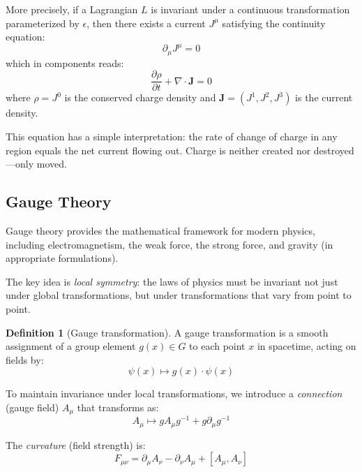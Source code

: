 \documentclass[12pt,letterpaper]{article}
\theoremstyle{definition}
\newtheorem{definition}[theorem]{Definition}
\theoremstyle{remark}
\begin{document}
More precisely, if a Lagrangian $L$ is invariant under a continuous transformation parameterized by $\epsilon$, then there exists a current $J^\mu$ satisfying the continuity equation:
\begin{equation}
\partial_\mu J^\mu = 0
\end{equation}
which in components reads:
\begin{equation}
\frac{\partial \rho}{\partial t} + \nabla \cdot \mathbf{J} = 0
\end{equation}
where $\rho = J^0$ is the conserved charge density and $\mathbf{J} = (J^1, J^2, J^3)$ is the current density.

This equation has a simple interpretation: the rate of change of charge in any region equals the net current flowing out. Charge is neither created nor destroyed---only moved.

\subsection{Gauge Theory}

Gauge theory provides the mathematical framework for modern physics, including electromagnetism, the weak force, the strong force, and gravity (in appropriate formulations).

The key idea is \textit{local symmetry}: the laws of physics must be invariant not just under global transformations, but under transformations that vary from point to point.

\begin{definition}[Gauge transformation]
A gauge transformation is a smooth assignment of a group element $g(x) \in G$ to each point $x$ in spacetime, acting on fields by:
\begin{equation}
\psi(x) \mapsto g(x) \cdot \psi(x)
\end{equation}
\end{definition}

To maintain invariance under local transformations, we introduce a \textit{connection} (gauge field) $A_\mu$ that transforms as:
\begin{equation}
A_\mu \mapsto g A_\mu g^{-1} + g \partial_\mu g^{-1}
\end{equation}

The \textit{curvature} (field strength) is:
\begin{equation}
F_{\mu\nu} = \partial_\mu A_\nu - \partial_\nu A_\mu + [A_\mu, A_\nu]
\end{equation}
\end{document}
